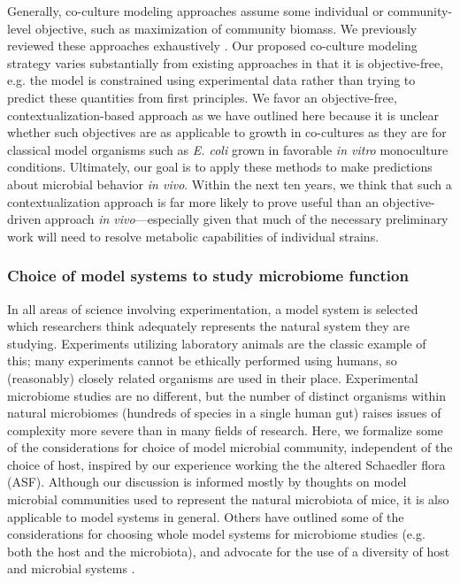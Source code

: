 \documentclass[11pt,onecolumn,notitlepage,openany,twoside]{book}
\begin{document}
\begin{refsection}
Generally, co-culture modeling approaches assume some individual or community-level objective, such as maximization of community biomass. We previously reviewed these approaches exhaustively \cite{Biggs2015-lz}. Our proposed co-culture modeling strategy varies substantially from existing approaches in that it is objective-free, e.g. the model is constrained using experimental data rather than trying to predict these quantities from first principles. We favor an objective-free, contextualization-based approach as we have outlined here because it is unclear whether such objectives are as applicable to growth in co-cultures as they are for classical model organisms such as \textit{E. coli} grown in favorable \textit{in vitro} monoculture conditions. Ultimately, our goal is to apply these methods to make predictions about microbial behavior \textit{in vivo}. Within the next ten years, we think that such a contextualization approach is far more likely to prove useful than an objective-driven approach \textit{in vivo}---especially given that much of the necessary preliminary work will need to resolve metabolic capabilities of individual strains.

\subsubsection{Choice of model systems to study microbiome function}

In all areas of science involving experimentation, a model system is selected which researchers think adequately represents the natural system they are studying. Experiments utilizing laboratory animals are the classic example of this; many experiments cannot be ethically performed using humans, so (reasonably) closely related organisms are used in their place. Experimental microbiome studies are no different, but the number of distinct organisms within natural microbiomes (hundreds of species in a single human gut) raises issues of complexity more severe than in many fields of research.  Here, we formalize some of the considerations for choice of model microbial community, independent of the choice of host, inspired by our experience working the the altered Schaedler flora (ASF). Although our discussion is informed mostly by thoughts on model microbial communities used to represent the natural microbiota of mice, it is also applicable to model systems in general. Others have outlined some of the considerations for choosing whole model systems for microbiome studies (e.g. both the host and the microbiota), and advocate for the use of a diversity of host and microbial systems \cite{Douglas2018-oj}.


\end{refsection}
\end{document}
